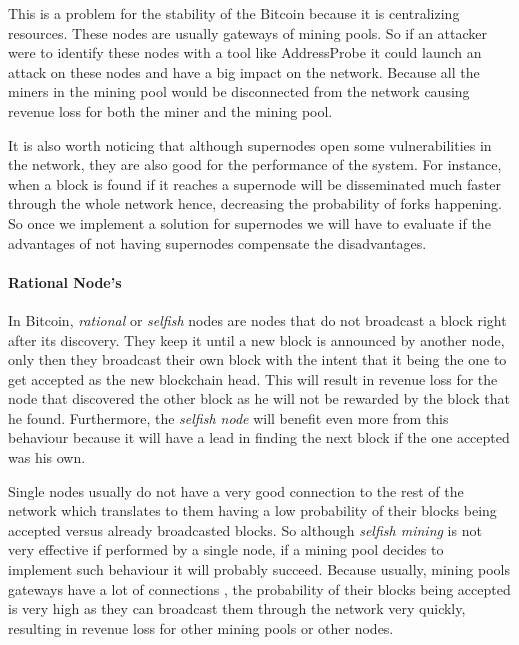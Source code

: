 This is a problem for the stability of the Bitcoin because it is centralizing resources. These nodes are usually gateways of mining pools. So if an attacker were to identify these nodes with a tool like AddressProbe \cite{miller2015discovering} it could launch an attack on these nodes and have a big impact on the network. Because all the miners in the mining pool would be disconnected from the network causing revenue loss for both the miner and the mining pool.

It is also worth noticing that although supernodes open some vulnerabilities in the network, they are also good for the performance of the system. For instance, when a block is found if it reaches a supernode will be disseminated much faster through the whole network hence, decreasing the probability of forks happening. So once we implement a solution for supernodes we will have to evaluate if the advantages of not having supernodes compensate the disadvantages.

\paragraph*{\textbf{Rational Node's}} In Bitcoin, \textit{rational} or \textit{selfish} nodes are nodes that do not broadcast a block right after its discovery. They keep it until a new block is announced by another node, only then they broadcast their own block with the intent that it being the one to get accepted as the new blockchain head. This will result in revenue loss for the node that discovered the other block as he will not be rewarded by the block that he found. Furthermore, the \textit{selfish node} will benefit even more from this behaviour because it will have a lead in finding the next block if the one accepted was his own.

Single nodes usually do not have a very good connection to the rest of the network which translates to them having a low probability of their blocks being accepted versus already broadcasted blocks. So although \textit{selfish mining} is not very effective if performed by a single node, if a mining pool decides to implement such behaviour it will probably succeed. Because usually, mining pools gateways have a lot of connections \cite{miller2015discovering}, the probability of their blocks being accepted is very high as they can broadcast them through the network very quickly, resulting in revenue loss for other mining pools or other nodes.





